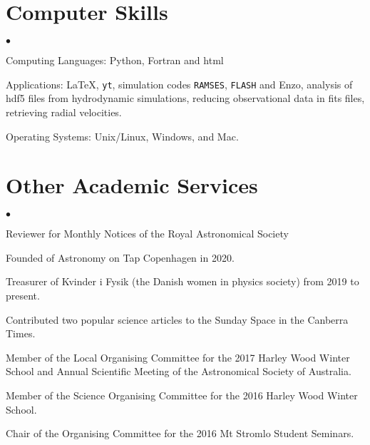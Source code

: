 \documentclass[margin,line]{res}
\newenvironment{list2}{
	\begin{list}{$\bullet$}{%
			\setlength{\itemsep}{0in}
			\setlength{\parsep}{0in} \setlength{\parskip}{0in}
			\setlength{\topsep}{0in} \setlength{\partopsep}{0in} 
			\setlength{\leftmargin}{0.2in}}}{\end{list}}
\begin{document}
\begin{resume}
		\section{\sc Computer Skills} 
		\begin{list2}
			\item Computing Languages: Python, Fortran and html
			\item Applications: \LaTeX , \texttt{yt}, simulation codes \texttt{RAMSES}, \texttt{FLASH} and Enzo, analysis of hdf5 files from hydrodynamic simulations, reducing observational data in fits files, retrieving radial velocities.  
			\item Operating Systems:  Unix/Linux, Windows, and Mac.
		\end{list2}
		
		\section{\sc Other Academic Services}
		\begin{list2}
			\item Reviewer for Monthly Notices of the Royal Astronomical Society
			\item Founded of Astronomy on Tap Copenhagen in 2020.
			\item Treasurer of Kvinder i Fysik (the Danish women in physics society) from 2019 to present.
			\item Contributed two popular science articles to the Sunday Space in the Canberra Times. 
			\item Member of the Local Organising Committee for the 2017 Harley Wood Winter School and Annual Scientific Meeting of the Astronomical Society of Australia.
			\item Member of the Science Organising Committee for the 2016 Harley Wood Winter School.
			\item Chair of the Organising Committee for the 2016 Mt Stromlo Student Seminars.
		\end{list2}
		

\end{resume}
\end{document}
